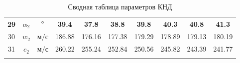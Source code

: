 \begin{landscape}
\begin{center}
\begin{longtable}{|c|c|c|c|c|c|c|c|c|c|}
				29 & $\alpha_2$ & $\degree$ & 39.4 & 37.8 & 38.8 & 39.8 & 40.3 & 40.8 & 41.3 \\\hline
			
				30 & $w_2$ & $м/с$ & 186.88 & 176.16 & 177.38 & 179.29 & 178.89 & 179.13 & 180.19 \\\hline
			
				31 & $c_2$ & $м/с$ & 260.22 & 255.24 & 252.84 & 250.56 & 245.82 & 243.39 & 241.77 \\\hline
			
		\caption{Сводная таблица параметров КНД} \label{tab:lpc-stage-total}
		\end{longtable}
	\end{center}
\end{landscape}
